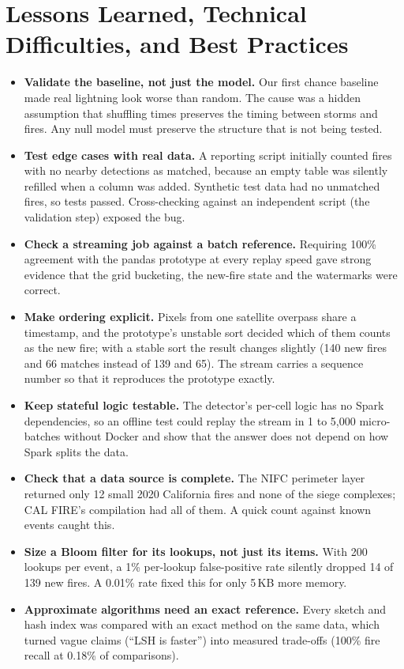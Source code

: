 \documentclass[10pt,journal,compsoc]{IEEEtran}
\begin{document}
\section{Lessons Learned, Technical Difficulties, and Best Practices}\label{sec:lessons}
\begin{itemize}
\item \textbf{Validate the baseline, not just the model.} Our first chance baseline made real lightning look worse than random. The cause was a hidden assumption that shuffling times preserves the timing between storms and fires. Any null model must preserve the structure that is not being tested.
\item \textbf{Test edge cases with real data.} A reporting script initially counted fires with no nearby detections as matched, because an empty table was silently refilled when a column was added. Synthetic test data had no unmatched fires, so tests passed. Cross-checking against an independent script (the validation step) exposed the bug.
\item \textbf{Check a streaming job against a batch reference.} Requiring 100\% agreement with the pandas prototype at every replay speed gave strong evidence that the grid bucketing, the new-fire state and the watermarks were correct.
\item \textbf{Make ordering explicit.} Pixels from one satellite overpass share a timestamp, and the prototype's unstable sort decided which of them counts as the new fire; with a stable sort the result changes slightly (140 new fires and 66 matches instead of 139 and 65). The stream carries a sequence number so that it reproduces the prototype exactly.
\item \textbf{Keep stateful logic testable.} The detector's per-cell logic has no Spark dependencies, so an offline test could replay the stream in 1 to 5,000 micro-batches without Docker and show that the answer does not depend on how Spark splits the data.
\item \textbf{Check that a data source is complete.} The NIFC perimeter layer returned only 12 small 2020 California fires and none of the siege complexes; CAL FIRE's compilation had all of them. A quick count against known events caught this.
\item \textbf{Size a Bloom filter for its lookups, not just its items.} With 200 lookups per event, a 1\% per-lookup false-positive rate silently dropped 14 of 139 new fires. A 0.01\% rate fixed this for only 5\,KB more memory.
\item \textbf{Approximate algorithms need an exact reference.} Every sketch and hash index was compared with an exact method on the same data, which turned vague claims (``LSH is faster'') into measured trade-offs (100\% fire recall at 0.18\% of comparisons).

\end{itemize}
\end{document}
